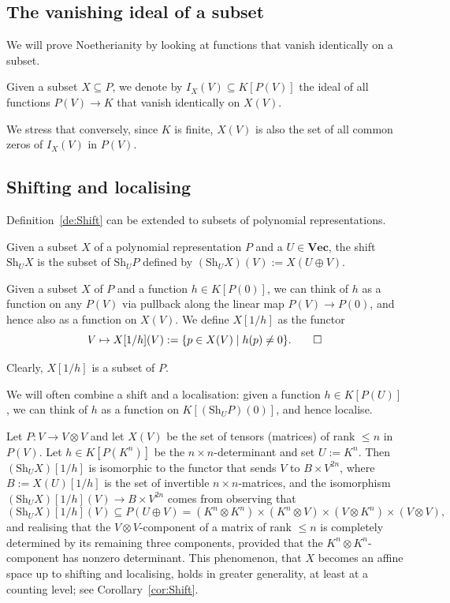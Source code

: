 \documentclass{amsart}
\renewcommand{\Vec}{\mathbf{Vec}}
\newcommand{\Sh}{\mathrm{Sh}}
\begin{document}
\subsection{The vanishing ideal of a subset}

We will prove Noetherianity by looking at functions that
vanish identically on a subset.

\begin{de}
Given a subset $X \subseteq P$, we denote by $I_X(V) \subseteq K[P(V)]$
the ideal of all functions $P(V) \to K$ that vanish
identically on $X(V)$.  
\end{de}

We stress that conversely, since $K$ is finite, $X(V)$ is also the set of
all common zeros of $I_X(V)$ in $P(V)$. 

\subsection{Shifting and localising}

Definition~\ref{de:Shift} can be extended to subsets of
polynomial representations.

\begin{de}
Given a subset $X$ of a polynomial representation $P$ and a $U \in
\Vec$, the shift $\Sh_U X$ is the subset of $\Sh_U P$ defined by $(\Sh_U
X)(V):=X(U \oplus V)$.
\end{de}

\begin{de}
Given a subset $X$ of $P$ and a function $h \in K[P(0)]$, we can think of
$h$ as a function on any $P(V)$ via pullback along the linear map $P(V)
\to P(0)$, and hence also as a function on $X(V)$. We define $X[1/h]$
as the functor
\[ V \mapsto X[1/h](V):=\{p \in X(V) \mid h(p) \neq 0\}.
\qedhere \]
\end{de}

Clearly, $X[1/h]$ is a subset of $P$. 

We will often combine a shift and a localisation: given a function $h
\in K[P(U)]$, we can think of $h$ as a function on $K[(\Sh_U P)(0)]$,
and hence localise. 

\begin{ex} \label{ex:Matrices}
Let $P:V \to V \otimes V$ and let $X(V)$ be the set of
tensors (matrices) of rank $\leq n$ in $P(V)$. Let $h \in K[P(K^n)]$ be the $n \times n$-determinant
and set $U:=K^n$. Then $(\Sh_U X)[1/h]$ is isomorphic to the functor
that sends $V$ to $B \times V^{2n}$, where $B:=X(U)[1/h]$ is the set of
invertible $n \times n$-matrices, and the isomorphism $(\Sh_U X)[1/h](V)
\to B \times V^{2n}$ comes from observing that
\[ (\Sh_U X)[1/h](V) \subseteq P(U \oplus V)=(K^n \otimes
K^n) \times (K^n \otimes V) \times (V \otimes K^n) \times (V
\otimes V), \]
and realising that the $V \otimes V$-component of a matrix of rank
$\leq n$ is completely determined by its remaining three components,
provided that the $K^n \otimes K^n$-component has nonzero determinant.
This phenomenon, that $X$ becomes an affine space up to shifting and
localising, holds in greater generality, at least at a
counting level; see Corollary~\ref{cor:Shift}.
\end{ex}
\end{document}
